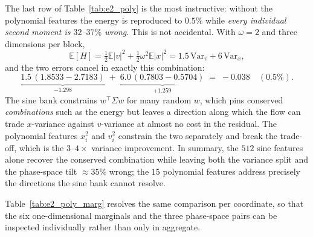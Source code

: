 \documentclass[11pt]{article}
\newcommand{\E}{\mathbb{E}}
\theoremstyle{plain}
\begin{document}
The last row of Table~\ref{tab:e2_poly} is the most instructive: without the polynomial features the energy is reproduced to $0.5\%$ while \emph{every individual second moment is $32$--$37\%$ wrong}. This is not accidental. With $\omega=2$ and three dimensions per block,
\begin{equation}
\E[H]=\tfrac12\E|v|^2+\tfrac12\omega^2\E|x|^2=1.5\,\mathrm{Var}_v+6\,\mathrm{Var}_x ,
\end{equation}
and the two errors cancel in exactly this combination:
\begin{equation}
\underbrace{1.5\,(1.8533-2.7183)}_{-1.298}\;+\;\underbrace{6.0\,(0.7803-0.5704)}_{+1.259}\;=\;-0.038 \quad (0.5\%).
\end{equation}
The sine bank constrains $w^\top\Sigma w$ for many random $w$, which pins conserved \emph{combinations} such as the energy but leaves a direction along which the flow can trade $x$-variance against $v$-variance at almost no cost in the residual. The polynomial features $x_i^2$ and $v_i^2$ constrain the two separately and break the trade-off, which is the $3$--$4\times$ variance improvement. In summary, the $512$ sine features alone recover the conserved combination while leaving both the variance split and the phase-space tilt $\approx35\%$ wrong; the $15$ polynomial features address precisely the directions the sine bank cannot resolve. 


Table~\ref{tab:e2_poly_marg} resolves the same comparison per coordinate, so that the six one-dimensional marginals and the three phase-space pairs can be inspected individually rather than only in aggregate.
\end{document}

